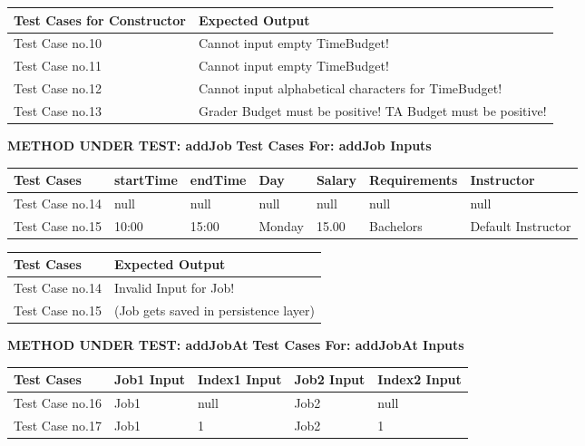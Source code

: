 \documentclass[12pt]{report}
\begin{document}
	\begin{flushleft}
		\begin{tabular}{ | l | l | }
			\hline
			Test Cases for Constructor & Expected Output \\ \hline
			Test Case no.10 & Cannot input empty TimeBudget! \\ \hline
			Test Case no.11 & Cannot input empty TimeBudget! \\ \hline
			Test Case no.12 & Cannot input alphabetical characters for TimeBudget!  \\ \hline
			Test Case no.13 & Grader Budget must be positive! TA Budget must be positive!    \\ \hline
		\end{tabular}
	\end{flushleft}
	
	\newpage
	\textbf{METHOD UNDER TEST: addJob} \newline
	\textbf{Test Cases For: addJob Inputs} 
	\begin{flushleft}
		\begin{tabular}{ | l | l | l | l | l | l | l | }
			\hline
			Test Cases & startTime & endTime & Day & Salary & Requirements & Instructor \\ \hline
			Test Case no.14 & null & null & null & null & null & null \\ \hline
			Test Case no.15 & 10:00 & 15:00 & Monday & 15.00 & Bachelors & Default Instructor \\ \hline
		\end{tabular}
	\end{flushleft}
	
	\begin{flushleft}
		\begin{tabular}{ | l | l | }
			\hline
			Test Cases & Expected Output \\ \hline
			Test Case no.14 & Invalid Input for Job! \\ \hline
			Test Case no.15 & (Job gets saved in persistence layer) \\ \hline
		\end{tabular}
	\end{flushleft}

	\textbf{METHOD UNDER TEST: addJobAt} \newline
	\textbf{Test Cases For: addJobAt Inputs}
	\begin{flushleft}
		\begin{tabular}{ | l | l | l | l | l | }
			\hline
			Test Cases & Job1 Input & Index1 Input & Job2 Input & Index2 Input \\ \hline
			Test Case no.16 & Job1 & null & Job2 & null \\ \hline
			Test Case no.17 & Job1 & 1 & Job2 & 1 \\ \hline
		\end{tabular}
	\end{flushleft}
	
\end{document}

